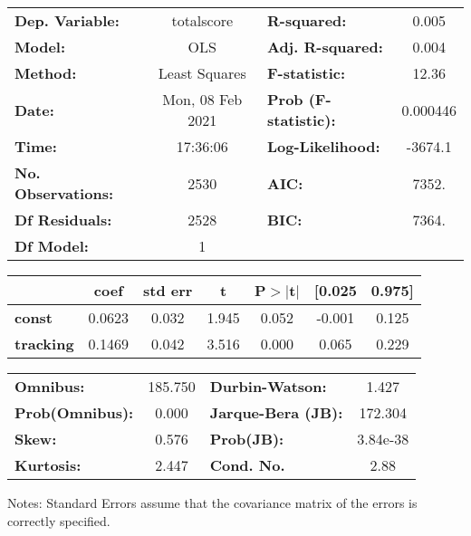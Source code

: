 \begin{center}
\begin{tabular}{lclc}
\toprule
\textbf{Dep. Variable:}    &    totalscore    & \textbf{  R-squared:         } &     0.005   \\
\textbf{Model:}            &       OLS        & \textbf{  Adj. R-squared:    } &     0.004   \\
\textbf{Method:}           &  Least Squares   & \textbf{  F-statistic:       } &     12.36   \\
\textbf{Date:}             & Mon, 08 Feb 2021 & \textbf{  Prob (F-statistic):} &  0.000446   \\
\textbf{Time:}             &     17:36:06     & \textbf{  Log-Likelihood:    } &   -3674.1   \\
\textbf{No. Observations:} &        2530      & \textbf{  AIC:               } &     7352.   \\
\textbf{Df Residuals:}     &        2528      & \textbf{  BIC:               } &     7364.   \\
\textbf{Df Model:}         &           1      & \textbf{                     } &             \\
\bottomrule
\end{tabular}
\begin{tabular}{lcccccc}
                  & \textbf{coef} & \textbf{std err} & \textbf{t} & \textbf{P$> |$t$|$} & \textbf{[0.025} & \textbf{0.975]}  \\
\midrule
\textbf{const}    &       0.0623  &        0.032     &     1.945  &         0.052        &       -0.001    &        0.125     \\
\textbf{tracking} &       0.1469  &        0.042     &     3.516  &         0.000        &        0.065    &        0.229     \\
\bottomrule
\end{tabular}
\begin{tabular}{lclc}
\textbf{Omnibus:}       & 185.750 & \textbf{  Durbin-Watson:     } &    1.427  \\
\textbf{Prob(Omnibus):} &   0.000 & \textbf{  Jarque-Bera (JB):  } &  172.304  \\
\textbf{Skew:}          &   0.576 & \textbf{  Prob(JB):          } & 3.84e-38  \\
\textbf{Kurtosis:}      &   2.447 & \textbf{  Cond. No.          } &     2.88  \\
\bottomrule
\end{tabular}
\end{center}

Notes: \newline
 [1] Standard Errors assume that the covariance matrix of the errors is correctly specified.
